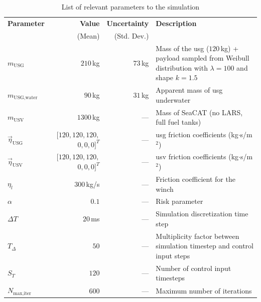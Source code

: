 \begin{table}[h!]
    \centering
    \caption{List of relevant parameters to the simulation}
    \label{tab:Parameters}
    \begin{tabularx}{\linewidth}{l r r X}
        \toprule
        \textbf{Parameter} & \textbf{Value} & \textbf{Uncertainty} & \textbf{Description} \\
         & (Mean) & (Std. Dev.) & \\
        \midrule
        $m_{\text{USG}}$ & $210$\,kg & $73$\,kg & Mass of the \gls{usg} ($120$\,kg) + payload sampled from Weibull distribution with $\lambda = 100$ and shape $k = 1.5$ \\
        $m_{\text{USG,water}}$ & $90$\,kg & $31$\,kg & Apparent mass of \gls{usg} underwater \\
        $m_{\text{USV}}$ & $1300$\,kg & --- & Mass of SeaCAT (no LARS, full fuel tanks) \\
        $\vec{\eta}_{\text{USG}}$ & $[120, 120, 120,$ $0, 0, 0]^T$ & --- & \gls{usg} friction coefficients (kg$\cdot$s/m$^2$) \\
        $\vec{\eta}_{\text{USV}}$ & $[120, 120, 120,$ $0, 0, 0]^T$ & --- & \gls{usv} friction coefficients (kg$\cdot$s/m$^2$) \\
        $\eta_{l}$ & $300$\,kg/s & --- & Friction coefficient for the winch \\
        $\alpha$ & $0.1$ & --- & Risk parameter \\
        $\Delta T$ & $20$\,ms & --- & Simulation discretization time step \\
        $T_{\Delta}$ & $50$ & --- & Multiplicity factor between simulation timestep and control input steps \\
        $S_T$ & $120$ & --- & Number of control input timesteps \\
        $N_{\text{max,iter}}$ & $600$ & --- & Maximum number of iterations \\
        \bottomrule
    \end{tabularx}
\end{table}

